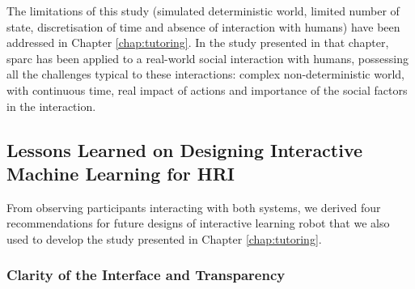 The limitations of this study (simulated deterministic world, limited number of state, discretisation of time and absence of interaction with humans) have been addressed in Chapter \ref{chap:tutoring}. In the study presented in that chapter, \gls{sparc} has been applied to a real-world social interaction with humans, possessing all the challenges typical to these interactions: complex non-deterministic world, with continuous time, real impact of actions and importance of the social factors in the interaction.


\subsection{Lessons Learned on Designing Interactive Machine Learning for HRI}

From observing participants interacting with both systems, we derived four recommendations for future designs of interactive learning robot that we also used to develop the study presented in Chapter \ref{chap:tutoring}. 

\subsubsection{Clarity of the Interface and Transparency}

